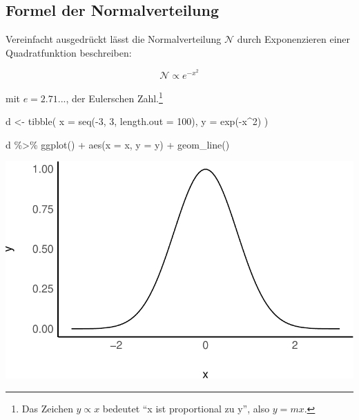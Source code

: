 \documentclass[
  a4paper,
  DIV=11]{scrreprt}
\newenvironment{Shaded}{\begin{snugshade}}{\end{snugshade}}
\newcommand{\AttributeTok}[1]{\textcolor[rgb]{0.40,0.45,0.13}{#1}}
\newcommand{\DecValTok}[1]{\textcolor[rgb]{0.68,0.00,0.00}{#1}}
\newcommand{\FunctionTok}[1]{\textcolor[rgb]{0.28,0.35,0.67}{#1}}
\newcommand{\NormalTok}[1]{\textcolor[rgb]{0.00,0.23,0.31}{#1}}
\newcommand{\OtherTok}[1]{\textcolor[rgb]{0.00,0.23,0.31}{#1}}
\newcommand{\SpecialCharTok}[1]{\textcolor[rgb]{0.37,0.37,0.37}{#1}}
\theoremstyle{definition}
\theoremstyle{remark}
\begin{document}
\hypertarget{formel-der-normalverteilung}{%
\subsection{Formel der
Normalverteilung}\label{formel-der-normalverteilung}}

Vereinfacht ausgedrückt lässt die Normalverteilung \(\mathcal{N}\) durch
Exponenzieren einer Quadratfunktion beschreiben:

\[\mathcal{N} \propto e^{-x^2}\]

mit \(e=2.71...\), der Eulerschen Zahl.\footnote{Das Zeichen
  \(y \propto x\) bedeutet ``x ist proportional zu y'', also \(y = mx\).}

\begin{Shaded}
\begin{Highlighting}[]
\NormalTok{d }\OtherTok{\textless{}{-}}
  \FunctionTok{tibble}\NormalTok{(}
    \AttributeTok{x =} \FunctionTok{seq}\NormalTok{(}\SpecialCharTok{{-}}\DecValTok{3}\NormalTok{, }\DecValTok{3}\NormalTok{, }
            \AttributeTok{length.out =} \DecValTok{100}\NormalTok{),}
    \AttributeTok{y =} \FunctionTok{exp}\NormalTok{(}\SpecialCharTok{{-}}\NormalTok{x}\SpecialCharTok{\^{}}\DecValTok{2}\NormalTok{)}
\NormalTok{  )}

\NormalTok{d }\SpecialCharTok{\%\textgreater{}\%} 
  \FunctionTok{ggplot}\NormalTok{() }\SpecialCharTok{+}
  \FunctionTok{aes}\NormalTok{(}\AttributeTok{x =}\NormalTok{ x, }\AttributeTok{y =}\NormalTok{ y) }\SpecialCharTok{+}
  \FunctionTok{geom\_line}\NormalTok{()}
\end{Highlighting}
\end{Shaded}

\includegraphics{./Verteilungen_files/figure-pdf/Normalverteilung-10-1.pdf}
\end{document}
